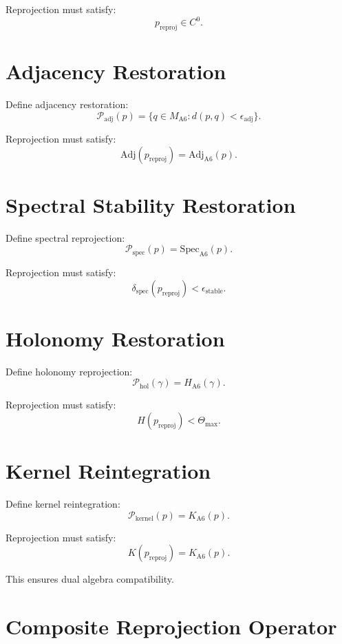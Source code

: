 \documentclass[11pt]{article}
\begin{document}
Reprojection must satisfy:
\[
p_{\mathrm{reproj}} \in C^0.
\]

\section{Adjacency Restoration}

Define adjacency restoration:
\[
\mathcal{P}_{\mathrm{adj}}(p)
  = \{ q \in M_{\mathrm{A6}} : d(p,q) < \epsilon_{\mathrm{adj}} \}.
\]

Reprojection must satisfy:
\[
\mathrm{Adj}(p_{\mathrm{reproj}}) = \mathrm{Adj}_{\mathrm{A6}}(p).
\]

\section{Spectral Stability Restoration}

Define spectral reprojection:
\[
\mathcal{P}_{\mathrm{spec}}(p)
  = \mathrm{Spec}_{\mathrm{A6}}(p).
\]

Reprojection must satisfy:
\[
\delta_{\mathrm{spec}}(p_{\mathrm{reproj}}) < \epsilon_{\mathrm{stable}}.
\]

\section{Holonomy Restoration}

Define holonomy reprojection:
\[
\mathcal{P}_{\mathrm{hol}}(\gamma)
  = H_{\mathrm{A6}}(\gamma).
\]

Reprojection must satisfy:
\[
H(p_{\mathrm{reproj}}) < \Theta_{\max}.
\]

\section{Kernel Reintegration}

Define kernel reintegration:
\[
\mathcal{P}_{\mathrm{kernel}}(p)
  = K_{\mathrm{A6}}(p).
\]

Reprojection must satisfy:
\[
K(p_{\mathrm{reproj}}) = K_{\mathrm{A6}}(p).
\]

This ensures dual algebra compatibility.

\section{Composite Reprojection Operator}
\end{document}
